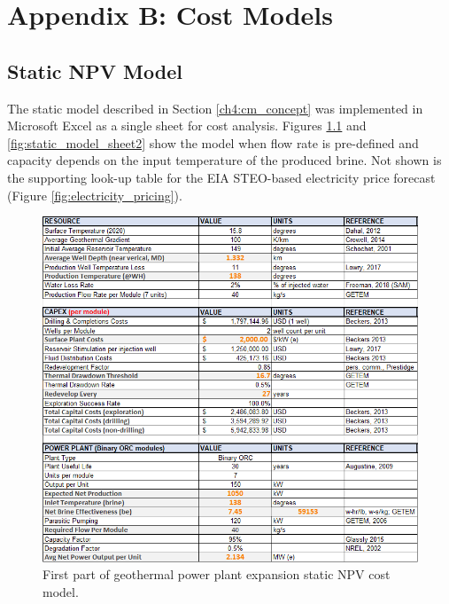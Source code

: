 \chapter{Appendix B: Cost Models}
\label{app:b}

\section{Static NPV Model}
The static model described in Section \ref{ch4:cm_concept} was implemented in Microsoft Excel as a single sheet for cost analysis. Figures \ref{fig:static_model_sheet1} and \ref{fig:static_model_sheet2} show the model when flow rate is pre-defined and capacity depends on the input temperature of the produced brine. Not shown is the supporting look-up table for the EIA STEO-based electricity price forecast (Figure \ref{fig:electricity_pricing}).

\begin{figure}[!htp]
\centering
\includegraphics[width=\textwidth]{templates/images/Figure-Static_Model_SheetA.png}
\caption[Static cost model worksheet (part 1)]{First part of geothermal power plant expansion static NPV cost model.}
\label{fig:static_model_sheet1}
\end{figure}

